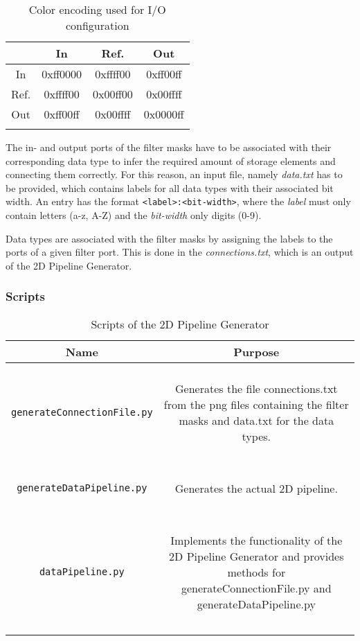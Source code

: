\begin{longtable}[ht]{|c|c|c|c|}
  \hline
  & In & Ref. & Out \\
  \hline
  In & \cellcolor{red!75}0xff0000 & \cellcolor{yellow!75}0xffff00 & \cellcolor{magenta!75}0xff00ff \\
  \hline
  Ref. & \cellcolor{yellow!75}0xffff00 & \cellcolor{green!75}0x00ff00 & \cellcolor{cyan!25}0x00ffff \\
  \hline
  Out & \cellcolor{magenta!75}0xff00ff & \cellcolor{cyan!25}0x00ffff & \cellcolor{blue!75}0x0000ff \\
  \hline
  \caption{Color encoding used for I/O configuration} \label{06-04-pipeline-generator-filter-masks}
\end{longtable}

The in- and output ports of the filter masks have to be associated with their corresponding data type to infer the required amount of storage elements and connecting them correctly.
For this reason, an input file, namely \textit{data.txt} has to be provided, which contains labels for all data types with their associated bit width.
An entry has the format \texttt{<label>:<bit-width>}, where the \textit{label} must only contain letters (a-z, A-Z) and the \textit{bit-width} only digits (0-9).

Data types are associated with the filter masks by assigning the labels to the ports of a given filter port.
This is done in the \textit{connections.txt}, which is an output of the 2D Pipeline Generator.


\subsubsection{Scripts}

\begin{longtable}[ht]{|c|c|}
\hline 
\textbf{Name} & \textbf{Purpose} \\
\hline 
\hline 
\endhead

\texttt{generateConnectionFile.py} & 
\parbox{7cm}{ ~ \\ 
Generates the file connections.txt from the png files containing the filter masks and data.txt for the data types.
\\ ~ } \\

\hline 

\texttt{generateDataPipeline.py} & 
\parbox{7cm}{ ~ \\ 
Generates the actual 2D pipeline.
\\ ~ } \\

\hline 

\texttt{dataPipeline.py} & 
\parbox{7cm}{ ~ \\ 
Implements the functionality of the 2D Pipeline Generator and provides methods for generateConnectionFile.py and generateDataPipeline.py
\\ ~ } \\

\hline 

\caption{Scripts of the 2D Pipeline Generator} \label{06-04-pipeline-generator-scripts}\\
\end{longtable}

